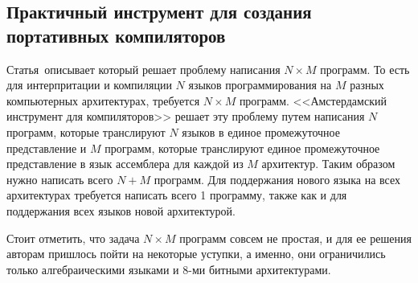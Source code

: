 \subsection{Практичный инструмент для создания портативных компиляторов} \label{subsection_Tanenbaum1983}
Статья\,\cite{Tanenbaum1983} описывает  который решает проблему написания \(N \times M\) программ. То есть для интерпритации и компиляции \(N\) языков программирования на \(M\) разных компьютерных архитектурах, требуется \(N \times M\) программ. <<Амстердамский инструмент для компиляторов>> решает эту проблему путем написания \(N\) программ, которые транслируют \(N\) языков в единое промежуточное представление и \(M\) программ, которые транслируют единое промежуточное представление в язык ассемблера для каждой из \(M\) архитектур. Таким образом нужно написать всего \(N + M\) программ. Для поддержания нового языка на всех архитектурах требуется написать всего 1 программу, также как и для поддержания всех языков новой архитектурой. 

Стоит отметить, что задача \(N \times M\) программ совсем не простая, и для ее решения авторам пришлось пойти на некоторые уступки, а именно, они ограничились только алгебраическими языками и 8-ми битными архитектурами.

